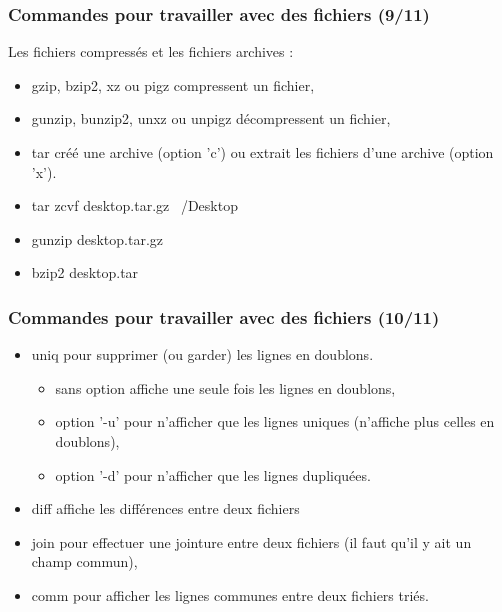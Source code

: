 \documentclass[handout,10pt]{beamer}
\begin{document}
\frame
{
    \frametitle{Commandes pour travailler avec des fichiers (9/11)}

    Les fichiers compressés et les fichiers archives :

    \begin{itemize}
        \item {\ttfamily gzip}, {\ttfamily bzip2}, {\ttfamily xz} ou {\ttfamily pigz} compressent un fichier,
        \item {\ttfamily gunzip}, {\ttfamily bunzip2}, {\ttfamily unxz} ou {\ttfamily unpigz} décompressent un fichier,
        \item {\ttfamily tar} créé une archive (option 'c') ou extrait les fichiers d'une archive (option 'x').
    \end{itemize}

    \begin{itemize}
        \item {\ttfamily tar zcvf desktop.tar.gz ~/Desktop}
        \item {\ttfamily gunzip desktop.tar.gz}
        \item {\ttfamily bzip2 desktop.tar}
    \end{itemize}
}


\frame
{
    \frametitle{Commandes pour travailler avec des fichiers (10/11)}

    \begin{itemize}
        \item {\ttfamily uniq} pour supprimer (ou garder) les lignes en doublons.
            \begin{itemize}
                \item sans option affiche une seule fois les lignes en doublons,
                \item option '-u' pour n'afficher que les lignes uniques (n'affiche plus celles en doublons),
                \item option '-d' pour n'afficher que les lignes dupliquées.
            \end{itemize}
        \item {\ttfamily diff} affiche les différences entre deux fichiers
        \item {\ttfamily join} pour effectuer une jointure entre deux fichiers (il faut qu'il y ait un champ commun),
        \item {\ttfamily comm} pour afficher les lignes communes entre deux fichiers triés.
    \end{itemize}
}
\end{document}
